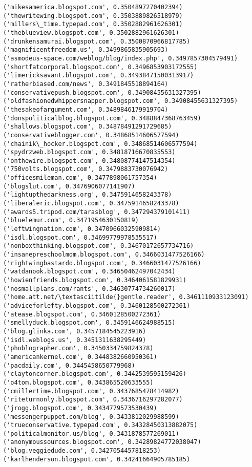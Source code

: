 \documentclass[11pt]{article}
\begin{document}
\begin{Verbatim}[commandchars=\\\{\}]
('mikesamerica.blogspot.com', 0.3504897270402394)
('thewritewing.blogspot.com', 0.3503889826518979)
('millers\_time.typepad.com', 0.3502882961626301)
('theblueview.blogspot.com', 0.3502882961626301)
('drunkensamurai.blogspot.com', 0.3500870966817785)
('magnificentfreedom.us', 0.3499865835905693)
('asmodeus-space.com/weblog/blog/index.php', 0.3497857304579491)
('shortfatcorporal.blogspot.com', 0.3496853903172555)
('limericksavant.blogspot.com', 0.34938471500313917)
('ratherbiased.com/news', 0.3491845518894164)
('conservativepush.blogspot.com', 0.34908455631327395)
('oldfashionedwhippersnapper.blogspot.com', 0.34908455631327395)
('thesakeofargument.com', 0.3489846179919704)
('donspoliticalblog.blogspot.com', 0.3488847368763459)
('shallows.blogspot.com', 0.34878491291729685)
('conservativeblogger.com', 0.34868514606577594)
('chainik\_hocker.blogspot.com', 0.34868514606577594)
('spydrzweb.blogspot.com', 0.34818716670835553)
('onthewire.blogspot.com', 0.34808774147514354)
('750volts.blogspot.com', 0.3479883730076942)
('officesmileman.com', 0.3477898061757354)
('blogslut.com', 0.3476906077141907)
('lightupthedarkness.org', 0.3475914658243378)
('liberaleric.blogspot.com', 0.3475914658243378)
('awards5.tripod.com/tarasblog', 0.347294379101411)
('bluelemur.com', 0.3471954630150819)
('leftwingnation.com', 0.34709660325909814)
('isdl.blogspot.com', 0.34699779978535517)
('nonboxthinking.blogspot.com', 0.34670172657734716)
('insanepreschoolmom.blogspot.com', 0.3466031477526166)
('rightwingbastardo.blogspot.com', 0.3466031477526166)
('watdanook.blogspot.com', 0.34650462497042434)
('howienfriends.blogspot.com', 0.3464061581829931)
('nosmallplans.com/rants', 0.34630774734260017)
('home.att.net/\textasciitilde{}gentle.reader', 0.3461110933123091)
('adviceforlefty.blogspot.com', 0.3460128500272361)
('atease.blogspot.com', 0.3460128500272361)
('smellyduck.blogspot.com', 0.3459146624988515)
('blog.glinka.com', 0.3457184545223916)
('isdl.weblogs.us', 0.3451311638295449)
('phoblographer.com', 0.3450334759824378)
('americankernel.com', 0.3448382660950361)
('pacdaily.com', 0.3445458650779968)
('claytoncorner.blogspot.com', 0.3442539595159426)
('o4tom.blogspot.com', 0.343865520633555)
('cmillertime.blogspot.com', 0.3437685478414982)
('riteturnonly.blogspot.com', 0.3436716297282077)
('jrogg.blogspot.com', 0.3434779573530439)
('messengerpuppet.com/blog', 0.3433812029988599)
('trueconservative.typepad.com', 0.34328450313882075)
('politicalmonitor.us/blog', 0.3431878577269011)
('anonymoussources.blogspot.com', 0.34289824772038047)
('blog.veggiedude.com', 0.3427054457818253)
('karlhenderson.blogspot.com', 0.34241664905785185)

\end{Verbatim}
\end{document}

